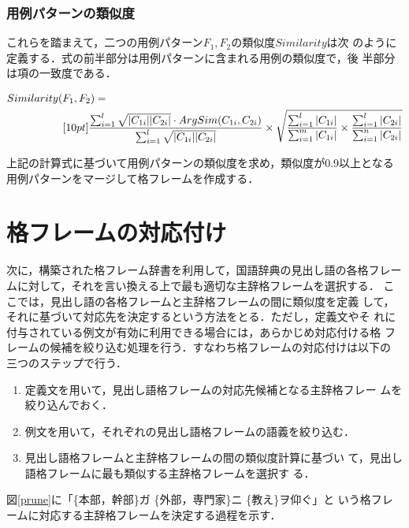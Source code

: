 \subsubsection{用例パターンの類似度}

これらを踏まえて，二つの用例パターン$F_1,F_2$の類似度$Similarity$は次
のように定義する．式の前半部分は用例パターンに含まれる用例の類似度で，後
半部分は項の一致度である．

\begin{eqnarray*}
 \lefteqn{Similarity(F_1,F_2)=} \hspace{13cm} \\ [10pt]
   \frac{
  \sum_{i=1}^{l} \sqrt{|C_{1i}||C_{2i}|} \cdot ArgSim(C_{1i},C_{2i})
  }
  {
  \sum_{i=1}^{l} \sqrt{|C_{1i}||C_{2i}|}
  }
  \times
  \sqrt{
  \frac{\sum_{i = 1}^{l}|C_{1i}|}{\sum_{i=1}^{m}|C_{1i}|} \times \frac{\sum_{i = 1}^{l}|C_{2i}|}{\sum_{i=1}^{n}|C_{2i}|} 
  }
\end{eqnarray*}

上記の計算式に基づいて用例パターンの類似度を求め，類似度が0.9以上となる
用例パターンをマージして格フレームを作成する．

\section{格フレームの対応付け}

次に，構築された格フレーム辞書を利用して，国語辞典の見出し語の各格フレー
ムに対して，それを言い換える上で最も適切な主辞格フレームを選択する．
ここでは，見出し語の各格フレームと主辞格フレームの間に類似度を定義
して，それに基づいて対応先を決定するという方法をとる．ただし，定義文やそ
れに付与されている例文が有効に利用できる場合には，あらかじめ対応付ける格
フレームの候補を絞り込む処理を行う．すなわち格フレームの対応付けは以下の
三つのステップで行う．

\begin{enumerate}
 \item 定義文を用いて，見出し語格フレームの対応先候補となる主辞格フレー
       ムを絞り込んでおく．
 \item 例文を用いて，それぞれの見出し語格フレームの語義を絞り込む．
 \item 見出し語格フレームと主辞格フレームの間の類似度計算に基づい
       て，見出し語格フレームに最も類似する主辞格フレームを選択す
       る．
\end{enumerate}

図\ref{prune}に「\{本部，幹部\}ガ \{外部，専門家\}ニ \{教え\}ヲ仰ぐ」と
いう格フレームに対応する主辞格フレームを決定する過程を示す．

